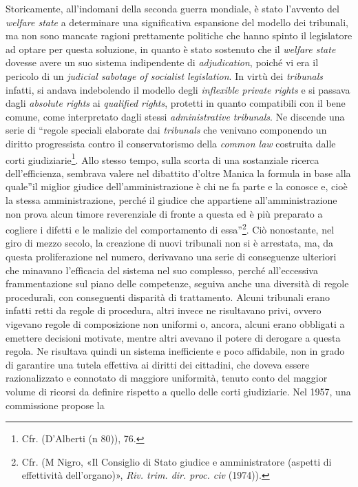 \documentclass[12pt,it,a4paper,]{report}
\begin{document}
Storicamente, all'indomani della seconda guerra mondiale, è stato
l'avvento del \emph{welfare state} a determinare una significativa
espansione del modello dei tribunali, ma non sono mancate ragioni
prettamente politiche che hanno spinto il legislatore ad optare per
questa soluzione, in quanto è stato sostenuto che il \emph{welfare
state} dovesse avere un suo sistema indipendente di \emph{adjudication},
poiché vi era il pericolo di un \emph{judicial sabotage of socialist
legislation}. In virtù dei \emph{tribunals} infatti, si andava
indebolendo il modello degli \emph{inflexible private rights} e si
passava dagli \emph{absolute rights} ai \emph{qualified rights},
protetti in quanto compatibili con il bene comune, come interpretato
dagli stessi \emph{administrative tribunals}. Ne discende una serie di
``regole speciali elaborate dai \emph{tribunals} che venivano componendo
un diritto progressista contro il conservatorismo della \emph{common
law} costruita dalle corti giudiziarie\footnote{Cfr. (D'Alberti (n 80)),
  76.}. Allo stesso tempo, sulla scorta di una sostanziale ricerca
dell'efficienza, sembrava valere nel dibattito d'oltre Manica la formula
in base alla quale''il miglior giudice dell'amministrazione è chi ne fa
parte e la conosce e, cioè la stessa amministrazione, perché il giudice
che appartiene all'amministrazione non prova alcun timore reverenziale
di fronte a questa ed è più preparato a cogliere i difetti e le malizie
del comportamento di essa''\footnote{Cfr. (M Nigro, {«Il Consiglio di
  Stato giudice e amministratore (aspetti di effettività dell'organo)»},
  \emph{Riv. trim. dir. proc. civ} (1974)).}. Ciò nonostante, nel giro
di mezzo secolo, la creazione di nuovi tribunali non si è arrestata, ma,
da questa proliferazione nel numero, derivavano una serie di conseguenze
ulteriori che minavano l'efficacia del sistema nel suo complesso, perché
all'eccessiva frammentazione sul piano delle competenze, seguiva anche
una diversità di regole procedurali, con conseguenti disparità di
trattamento. Alcuni tribunali erano infatti retti da regole di
procedura, altri invece ne risultavano privi, ovvero vigevano regole di
composizione non uniformi o, ancora, alcuni erano obbligati a emettere
decisioni motivate, mentre altri avevano il potere di derogare a questa
regola. Ne risultava quindi un sistema inefficiente e poco affidabile,
non in grado di garantire una tutela effettiva ai diritti dei cittadini,
che doveva essere razionalizzato e connotato di maggiore uniformità,
tenuto conto del maggior volume di ricorsi da definire rispetto a quello
delle corti giudiziarie. Nel 1957, una commissione propose la
\end{document}
